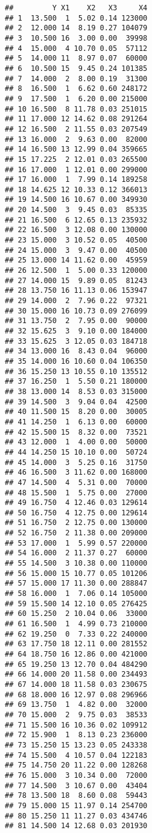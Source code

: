 \documentclass[
]{article}
\begin{document}
\begin{verbatim}
##         Y X1    X2   X3     X4
## 1  13.500  1  5.02 0.14 123000
## 2  12.000 14  8.19 0.27 104079
## 3  10.500 16  3.00 0.00  39998
## 4  15.000  4 10.70 0.05  57112
## 5  14.000 11  8.97 0.07  60000
## 6  10.500 15  9.45 0.24 101385
## 7  14.000  2  8.00 0.19  31300
## 8  16.500  1  6.62 0.60 248172
## 9  17.500  1  6.20 0.00 215000
## 10 16.500  8 11.78 0.03 251015
## 11 17.000 12 14.62 0.08 291264
## 12 16.500  2 11.55 0.03 207549
## 13 16.000  2  9.63 0.00  82000
## 14 16.500 13 12.99 0.04 359665
## 15 17.225  2 12.01 0.03 265500
## 16 17.000  1 12.01 0.00 299000
## 17 16.000  1  7.99 0.14 189258
## 18 14.625 12 10.33 0.12 366013
## 19 14.500 16 10.67 0.00 349930
## 20 14.500  3  9.45 0.03  85335
## 21 16.500  6 12.65 0.13 235932
## 22 16.500  3 12.08 0.00 130000
## 23 15.000  3 10.52 0.05  40500
## 24 15.000  3  9.47 0.00  40500
## 25 13.000 14 11.62 0.00  45959
## 26 12.500  1  5.00 0.33 120000
## 27 14.000 15  9.89 0.05  81243
## 28 13.750 16 11.13 0.06 153947
## 29 14.000  2  7.96 0.22  97321
## 30 15.000 16 10.73 0.09 276099
## 31 13.750  2  7.95 0.00  90000
## 32 15.625  3  9.10 0.00 184000
## 33 15.625  3 12.05 0.03 184718
## 34 13.000 16  8.43 0.04  96000
## 35 14.000 16 10.60 0.04 106350
## 36 15.250 13 10.55 0.10 135512
## 37 16.250  1  5.50 0.21 180000
## 38 13.000 14  8.53 0.03 315000
## 39 14.500  3  9.04 0.04  42500
## 40 11.500 15  8.20 0.00  30005
## 41 14.250  1  6.13 0.00  60000
## 42 15.500 15  8.32 0.00  73521
## 43 12.000  1  4.00 0.00  50000
## 44 14.250 15 10.10 0.00  50724
## 45 14.000  3  5.25 0.16  31750
## 46 16.500  3 11.62 0.00 168000
## 47 14.500  4  5.31 0.00  70000
## 48 15.500  1  5.75 0.00  27000
## 49 16.750  4 12.46 0.03 129614
## 50 16.750  4 12.75 0.00 129614
## 51 16.750  2 12.75 0.00 130000
## 52 16.750  2 11.38 0.00 209000
## 53 17.000  1  5.99 0.57 220000
## 54 16.000  2 11.37 0.27  60000
## 55 14.500  3 10.38 0.00 110000
## 56 15.000 15 10.77 0.05 101206
## 57 15.000 17 11.30 0.00 288847
## 58 16.000  1  7.06 0.14 105000
## 59 15.500 14 12.10 0.05 276425
## 60 15.250  2 10.04 0.06  33000
## 61 16.500  1  4.99 0.73 210000
## 62 19.250  0  7.33 0.22 240000
## 63 17.750 18 12.11 0.00 281552
## 64 18.750 16 12.86 0.00 421000
## 65 19.250 13 12.70 0.04 484290
## 66 14.000 20 11.58 0.00 234493
## 67 14.000 18 11.58 0.03 230675
## 68 18.000 16 12.97 0.08 296966
## 69 13.750  1  4.82 0.00  32000
## 70 15.000  2  9.75 0.03  38533
## 71 15.500 16 10.36 0.02 109912
## 72 15.900  1  8.13 0.23 236000
## 73 15.250 15 13.23 0.05 243338
## 74 15.500  4 10.57 0.04 122183
## 75 14.750 20 11.22 0.00 128268
## 76 15.000  3 10.34 0.00  72000
## 77 14.500  3 10.67 0.00  43404
## 78 13.500 18  8.60 0.08  59443
## 79 15.000 15 11.97 0.14 254700
## 80 15.250 11 11.27 0.03 434746
## 81 14.500 14 12.68 0.03 201930
\end{verbatim}
\end{document}
